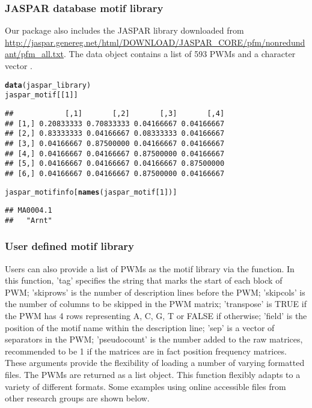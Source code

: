 \documentclass[a4paper,10pt]{article}\usepackage[]{graphicx}\usepackage[]{color}
\makeatletter
\newcommand{\hlnum}[1]{\textcolor[rgb]{0.686,0.059,0.569}{#1}}%
\newcommand{\hlstd}[1]{\textcolor[rgb]{0.345,0.345,0.345}{#1}}%
\newcommand{\hlkwd}[1]{\textcolor[rgb]{0.737,0.353,0.396}{\textbf{#1}}}%
\newenvironment{kframe}{%
 \def\at@end@of@kframe{}%
 \ifinner\ifhmode%
  \def\at@end@of@kframe{\end{minipage}}%
  \begin{minipage}{\columnwidth}%
 \fi\fi%
 \def\FrameCommand##1{\hskip\@totalleftmargin \hskip-\fboxsep
 \colorbox{shadecolor}{##1}\hskip-\fboxsep
     \hskip-\linewidth \hskip-\@totalleftmargin \hskip\columnwidth}%
 \MakeFramed {\advance\hsize-\width
   \@totalleftmargin\z@ \linewidth\hsize
   \@setminipage}}%
 {\par\unskip\endMakeFramed%
 \at@end@of@kframe}
\newenvironment{knitrout}{}{} %
\makeatother
\begin{document}
\subsubsection{JASPAR database motif library}

Our package also includes the JASPAR library downloaded from \url{http://jaspar.genereg.net/html/DOWNLOAD/JASPAR_CORE/pfm/nonredundant/pfm_all.txt}. The data object  contains a list of 593 PWMs  and a character vector .

\begin{knitrout}
\color{fgcolor}\begin{kframe}
\begin{alltt}
\hlkwd{data}\hlstd{(jaspar_library)}
\hlstd{jaspar_motif[[}\hlnum{1}\hlstd{]]}
\end{alltt}
\begin{verbatim}
##            [,1]       [,2]       [,3]       [,4]
## [1,] 0.20833333 0.70833333 0.04166667 0.04166667
## [2,] 0.83333333 0.04166667 0.08333333 0.04166667
## [3,] 0.04166667 0.87500000 0.04166667 0.04166667
## [4,] 0.04166667 0.04166667 0.87500000 0.04166667
## [5,] 0.04166667 0.04166667 0.04166667 0.87500000
## [6,] 0.04166667 0.04166667 0.87500000 0.04166667
\end{verbatim}
\begin{alltt}
\hlstd{jaspar_motifinfo[}\hlkwd{names}\hlstd{(jaspar_motif[}\hlnum{1}\hlstd{])]}
\end{alltt}
\begin{verbatim}
## MA0004.1 
##   "Arnt"
\end{verbatim}
\end{kframe}
\end{knitrout}


\subsubsection{User defined motif library}

Users can also provide a list of PWMs as the motif library via the  function. In this function, 'tag' specifies the string that marks the start of each block of PWM; 'skiprows' is the number of description lines before the PWM; 'skipcols' is the number of columns to be skipped in the PWM matrix; 'transpose' is TRUE if the PWM has 4 rows representing A, C, G, T or FALSE if otherwise; 'field' is the position of the motif name within the description line; 'sep' is a vector of separators in the PWM; 'pseudocount' is the number added to the raw matrices, recommended to be 1 if the matrices are in fact position frequency matrices. These arguments provide the flexibility of loading a number of varying formatted files. The PWMs are returned as a list object. This function flexibly adapts to a variety of different formats. Some examples using online accessible files from other research groups are shown below.
\end{document}
